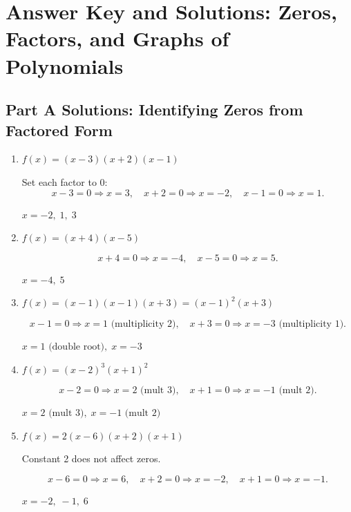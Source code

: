 \documentclass[14pt]{extarticle}
\begin{document}
\newpage


\section*{Answer Key and Solutions: Zeros, Factors, and Graphs of Polynomials}

\subsection*{Part A Solutions: Identifying Zeros from Factored Form}
\begin{enumerate}
  \item \(f(x) = (x - 3)(x + 2)(x - 1)\)

  Set each factor to 0:
  \[
  x - 3 = 0 \Rightarrow x = 3,\quad
  x + 2 = 0 \Rightarrow x = -2,\quad
  x - 1 = 0 \Rightarrow x = 1.
  \]

  \(\boxed{x = -2,\; 1,\; 3}\)

  \item \(f(x) = (x + 4)(x - 5)\)

  \[
  x + 4 = 0 \Rightarrow x = -4,\quad
  x - 5 = 0 \Rightarrow x = 5.
  \]

  \(\boxed{x = -4,\; 5}\)

  \item \(f(x) = (x - 1)(x - 1)(x + 3) = (x - 1)^2(x + 3)\)

  \[
  x - 1 = 0 \Rightarrow x = 1 \text{ (multiplicity 2)}, \quad
  x + 3 = 0 \Rightarrow x = -3 \text{ (multiplicity 1)}.
  \]

  \(\boxed{x = 1 \text{ (double root)},\; x = -3}\)

  \item \(f(x) = (x - 2)^3(x + 1)^2\)

  \[
  x - 2 = 0 \Rightarrow x = 2 \text{ (mult 3)},\quad
  x + 1 = 0 \Rightarrow x = -1 \text{ (mult 2)}.
  \]

  \(\boxed{x = 2 \text{ (mult 3)},\; x = -1 \text{ (mult 2)}}\)

  \item \(f(x) = 2(x - 6)(x + 2)(x + 1)\)

  Constant 2 does not affect zeros.

  \[
  x - 6 = 0 \Rightarrow x = 6,\quad
  x + 2 = 0 \Rightarrow x = -2,\quad
  x + 1 = 0 \Rightarrow x = -1.
  \]

  \(\boxed{x = -2,\; -1,\; 6}\)
\end{enumerate}
\end{document}
